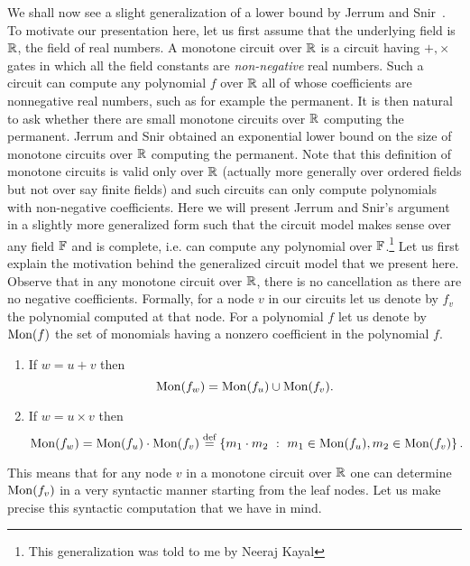 We shall now see a  slight generalization of a lower bound by Jerrum and Snir~\cite{js82}.  To motivate our presentation here, let us first assume that the underlying field is $\mathbb{R}$, the field of real numbers. A monotone circuit over $\mathbb{R}$ is a circuit having $+, \times$ gates in which all the field constants are {\em non-negative} real numbers. Such a circuit can compute any polynomial $f$ over $\mathbb{R}$ all of whose coefficients are nonnegative real numbers, such as for example the permanent. It is then natural to ask whether there are small monotone circuits over $\mathbb{R}$ computing the permanent. Jerrum and Snir \cite{js82} obtained an exponential lower bound on the size of monotone circuits over $\mathbb{R}$ computing the permanent. Note that this definition of monotone circuits is valid only over $\mathbb{R}$ (actually more generally over ordered fields but not over say finite fields) and such circuits can only compute polynomials with non-negative coefficients. Here we will present Jerrum and Snir's argument in a slightly more generalized form such that the circuit model makes sense over any field $\mathbb{F}$ and is complete, i.e.  can compute any polynomial over $\mathbb{F}$.\footnote{This generalization was told to me by Neeraj Kayal} Let us first explain the motivation behind the generalized circuit model that we present here. Observe that in any monotone circuit over $\mathbb{R}$, there is no cancellation as there are no negative coefficients. Formally, for a node $v$ in our circuits let us denote by $f_{v}$ the polynomial computed at that node. For a polynomial $f$ let us denote by $\mathrm{Mon}(f)$ the set of monomials having a nonzero coefficient in the polynomial $f$.
\begin{enumerate}
\item If $w = u + v$ then 
  $$ \mathrm{Mon}(f_{w}) = \mathrm{Mon}(f_{u}) \cup \mathrm{Mon}(f_{v}). $$
  
\item If $w = u \times v$ then
  $$ \mathrm{Mon}(f_{w}) = \mathrm{Mon}(f_{u}) \cdot \mathrm{Mon}(f_{v}) \stackrel{\text{def}}{=} \left\{{m_1\cdot m_2}\ : \ {m_1 \in \mathrm{Mon}(f_{u}), m_2\in \mathrm{Mon}(f_{v})}\right\}. $$
			
\end{enumerate}
This means that for any node $v$ in a monotone circuit over $\mathbb{R}$ one can determine $\mathrm{Mon}(f_{v})$ in a very syntactic manner starting from the leaf nodes. Let us make precise this syntactic computation that we have in mind.

